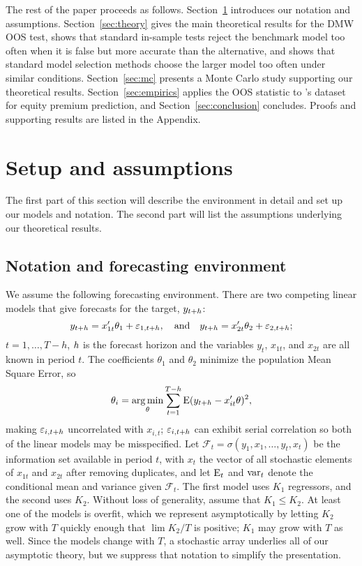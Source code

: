 \documentclass[11pt]{article}
\newcommand{\e}{\varepsilon}
\newcommand{\citepos}[1]{\citeauthor{#1}'s \citeyearpar{#1}}
\begin{document}
The rest of the paper proceeds as follows.
Section~\ref{sec:assumptions} introduces our notation and assumptions.
Section~\ref{sec:theory} gives the main theoretical results for the
DMW OOS test, shows that standard in-sample tests reject the
benchmark model too often when it is false but more accurate than the
alternative, and shows that standard model selection methods choose the
larger model too often under similar conditions. Section~\ref{sec:mc}
presents a Monte Carlo study supporting our theoretical results.
Section~\ref{sec:empirics} applies the OOS statistic to
\citepos{GoW:08} dataset for equity premium prediction, and
Section~\ref{sec:conclusion} concludes.  Proofs and supporting results
are listed in the Appendix.

\section{Setup and assumptions}\label{sec:assumptions}

The first part of this section will describe the environment in detail
and set up our models and notation. The second part will list the
assumptions underlying our theoretical results.

\subsection{Notation and forecasting environment}
We assume the following forecasting environment. There are two
competing linear models that give forecasts for the target,
$y_{t+h}$:
\begin{equation}
y_{t+\h} = x_{1t}'\theta_1 + \e_{1,t+h}, \quad\text{and}\quad
y_{t+\h} = x_{2t}'\theta_2 + \e_{2,t+h};
\end{equation}
$t = 1,\dots,T-h$, $h$ is the forecast horizon and the
variables $y_t$, $x_{1t}$, and $x_{2t}$ are all known in period $t$.
The coefficients $\theta_1$ and $\theta_2$ minimize the population
Mean Square Error, so
\begin{equation}
  \theta_i = \operatorname*{arg\,min}_\theta \sum_{t=1}^{T-h} \operatorname{E} (y_{t+h} - x_{it}'\theta)^2,
\end{equation}
making $\e_{i,t+\h}$ uncorrelated with $x_{i,t}$; $\e_{i,t+\h}$ can exhibit
serial correlation so both of the linear models may be misspecified.
Let $\mathcal{F}_t = \sigma(y_1, x_1, \dots, y_t, x_t)$ be the information
set available in period $t$,
with $x_t$ the vector of all stochastic elements of $x_{1t}$ and $x_{2t}$ after
removing duplicates, and let $\operatorname{E}_t$ and $\operatorname{var}_t$ denote the
conditional mean and variance given $\mathcal{F}_t$.  The first model
uses $K_1$ regressors, and the second uses $K_2$.  Without loss of
generality, assume that $K_1 \leq K_2$. At least one of the models is
overfit, which we represent asymptotically by letting $K_2$ grow with
$T$ quickly enough that $\lim K_2/T$ is positive; $K_1$ may grow with
$T$ as well. Since the models change with $T$, a
stochastic array underlies all of our asymptotic theory, but we
suppress that notation to simplify the presentation.
\end{document}
